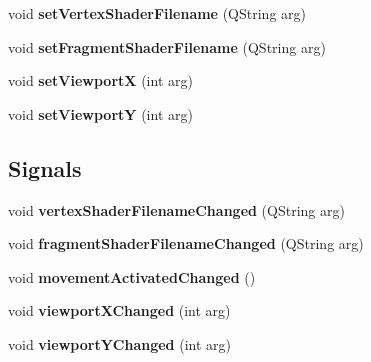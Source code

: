 \begin{DoxyCompactItemize}
void {\bfseries set\+Vertex\+Shader\+Filename} (Q\+String arg)
\item 
\mbox{\label{class_g_l_item_ad20ccfff6747a45ecd150f870fa832bf}} 
void {\bfseries set\+Fragment\+Shader\+Filename} (Q\+String arg)
\item 
\mbox{\label{class_g_l_item_aacd52a7466b26509442d8f6b80d6e6d9}} 
void {\bfseries set\+ViewportX} (int arg)
\item 
\mbox{\label{class_g_l_item_a9e93a59b34064c9417b3470373b9d0d7}} 
void {\bfseries set\+ViewportY} (int arg)
\end{DoxyCompactItemize}
\subsection*{Signals}
\begin{DoxyCompactItemize}
\item 
\mbox{\label{class_g_l_item_a2fea9c2dace4fa8f74b26a4d8c7d34c1}} 
void {\bfseries vertex\+Shader\+Filename\+Changed} (Q\+String arg)
\item 
\mbox{\label{class_g_l_item_a9ee193afb733b9dc81f3c1e0eed39880}} 
void {\bfseries fragment\+Shader\+Filename\+Changed} (Q\+String arg)
\item 
\mbox{\label{class_g_l_item_a2090aebc920ce93976316b9d43a44839}} 
void {\bfseries movement\+Activated\+Changed} ()
\item 
\mbox{\label{class_g_l_item_aa79438b1da8394ef68e912afdb78670c}} 
void {\bfseries viewport\+X\+Changed} (int arg)
\item 
\mbox{\label{class_g_l_item_ae652508d060e776d88285ca8a610d2fb}} 
void {\bfseries viewport\+Y\+Changed} (int arg)
\end{DoxyCompactItemize}
